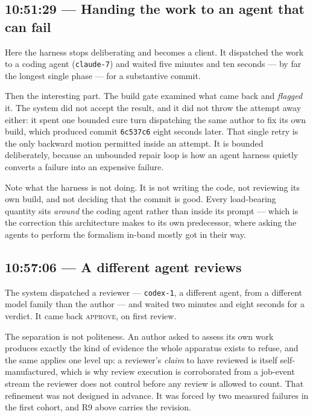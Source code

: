 \subsection*{10:51:29 --- Handing the work to an agent that can fail}

Here the harness stops deliberating and becomes a client.  It dispatched the
work to a coding agent (\texttt{claude-7}) and waited five minutes and ten
seconds --- by far the longest single phase --- for a substantive commit.

Then the interesting part.  The build gate examined what came back and
\emph{flagged} it.  The system did not accept the result, and it did not throw
the attempt away either: it spent one bounded cure turn dispatching the same
author to fix its own build, which produced commit \texttt{6c537c6} eight
seconds later.  That single retry is the only backward motion permitted inside
an attempt.  It is bounded deliberately, because an unbounded repair loop is how
an agent harness quietly converts a failure into an expensive failure.

Note what the harness is not doing.  It is not writing the code, not reviewing
its own build, and not deciding that the commit is good.  Every load-bearing
quantity sits \emph{around} the coding agent rather than inside its prompt ---
which is the correction this architecture makes to its own predecessor, where
asking the agents to perform the formalism in-band mostly got in their way.

\subsection*{10:57:06 --- A different agent reviews}

The system dispatched a reviewer --- \texttt{codex-1}, a different agent, from a
different model family than the author --- and waited two minutes and eight
seconds for a verdict.  It came back \textsc{approve}, on first review.

The separation is not politeness.  An author asked to assess its own work
produces exactly the kind of evidence the whole apparatus exists to refuse, and
the same applies one level up: a reviewer's \emph{claim} to have reviewed is
itself self-manufactured, which is why review execution is corroborated from a
job-event stream the reviewer does not control before any review is allowed to
count.  That refinement was not designed in advance.  It was forced by two
measured failures in the first cohort, and R9 above carries the revision.

